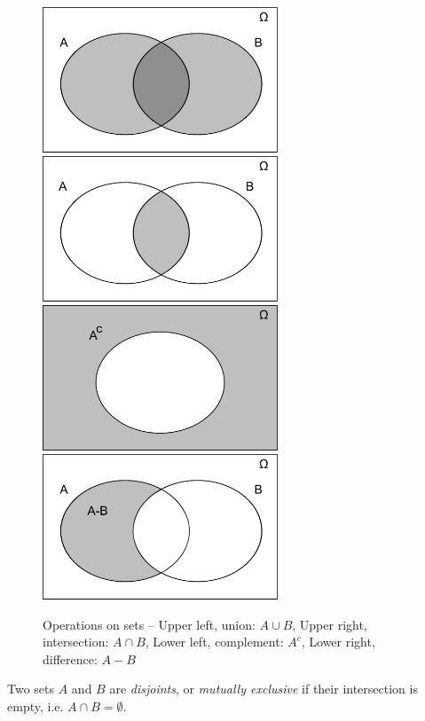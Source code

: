 \begin{figure}
\begin{center}
\includegraphics[width=7cm]{introdiscreteprobas/sets-union.pdf}
\includegraphics[width=7cm]{introdiscreteprobas/sets-intersection.pdf}
\includegraphics[width=7cm]{introdiscreteprobas/sets-complement.pdf}
\includegraphics[width=7cm]{introdiscreteprobas/sets-difference.pdf}
\end{center}
\caption{Operations on sets -- Upper left, union: $A\cup B$, 
Upper right, intersection: $A\cap B$, Lower left, complement: $A^c$,
Lower right, difference: $A-B$}
\label{fig-introstats-operationsonsets}
\end{figure}

Two sets $A$ and $B$ are \emph{disjoints}, or \emph{mutually exclusive} 
if their intersection is empty, i.e. $A\cap B = \emptyset$.


